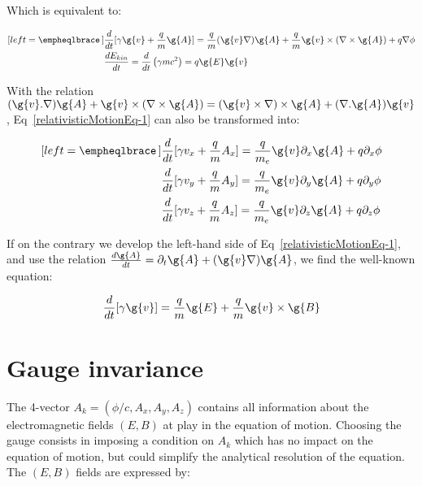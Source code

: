 \noindent Which is equivalent to:

\begin{subequations}
\label{relativisticMotionEq}
\begin{align}[left = \empheqlbrace\,]
&\frac{d}{dt}[\gamma \g{v} + \frac{q}{m}\g{A}] = \frac{q}{m}(\g{v}\nabla)\g{A} + \frac{q}{m}\g{v}\times (\nabla \times \g{A}) + q\nabla \phi \label{relativisticMotionEq-1} \\
&\frac{dE_{kin}}{dt} = \frac{d}{dt}\left( \gamma mc^2 \right) = q\g{E}\g{v} \label{relativisticMotionEq-2}
\end{align}
\end{subequations}

\noindent With the relation $(\g{v}.\nabla)\g{A} + \g{v}\times (\nabla \times \g{A}) = (\g{v}\times \nabla)\times \g{A} + (\nabla.\g{A})\g{v}$, Eq~\ref{relativisticMotionEq-1} can also be transformed into:


\begin{subequations}
\label{relativisticMotion3equation}
\begin{align}[left = \empheqlbrace\,]
&\frac{d}{dt}[\gamma v_x + \frac{q}{m}A_x] =\frac{q}{m_e}\g{v}\partial_x \g{A} + q\partial_x\phi \\
&\frac{d}{dt}[\gamma v_y + \frac{q}{m}A_y] = \frac{q}{m_e}\g{v}\partial_y \g{A}+ q\partial_y\phi \\
&\frac{d}{dt}[\gamma v_z + \frac{q}{m}A_z] = \frac{q}{m_e}\g{v}\partial_z \g{A}+ q\partial_z\phi
\end{align}
\end{subequations}

\noindent If on the contrary we develop the left-hand side of Eq~\ref{relativisticMotionEq-1}, and use the relation $\frac{d\g{A}}{dt} = \partial_t\g{A} + (\g{v}\nabla)\g{A}$, we find the well-known equation:

\begin{equation}
\frac{d}{dt}[\gamma \g{v} ]= \frac{q}{m}\g{E}+ \frac{q}{m}\g{v}\times \g{B}
\end{equation}


\section{Gauge invariance}

The 4-vector $A_k = (\phi/c,A_x,A_y,A_z)$ contains all information about the electromagnetic fields $(E,B)$ at play in the equation of motion. Choosing the gauge consists in imposing a condition on $A_k$ which has no impact on the equation of motion, but could simplify the analytical resolution of the equation.
The $(E,B)$ fields are expressed by: 

